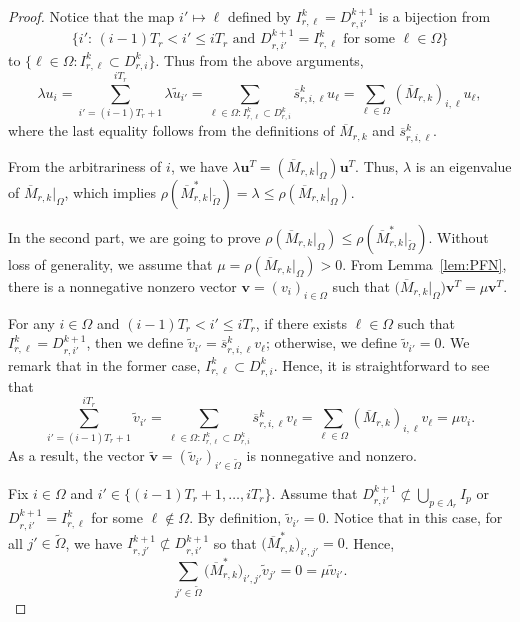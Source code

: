 \documentclass[10pt,a4paper]{amsart}
\def\wdt{\widetilde}
\newcommand{\bfu}{{\mathbf u}}
\newcommand{\bfv}{{\mathbf v}}
\newcommand{\upM}{{\overline{M}}}
\newcommand{\ups}{{\overline{s} }}
\begin{document}
\begin{proof}

Notice that the map
$i'\mapsto \ell$ defined by $I^{k}_{r,\ell}=D^{k+1}_{r,i'}$ is a bijection from 
\[
\big\{i':\, (i-1)T_r<i'\leq iT_r \mbox{ and } D_{r,i'}^{k+1}=I_{r,\ell}^k \mbox{ for some } \ell\in \Omega\big\}
\] 
to $\{\ell\in \Omega: I_{r,\ell}^k \subset D_{r,i}^k \}$. Thus from the above arguments, 
\[
  \lambda {u}_i=\sum_{i'=(i-1)T_r+1}^{iT_r} \lambda \wdt{u}_{i'}=\sum_{\ell\in \Omega: I_{r,\ell}^k \subset D_{r,i}^k} \ups_{r,i,\ell}^k u_{\ell}=
   \sum_{\ell\in \Omega} (\upM_{r,k})_{i,\ell}  u_{\ell},
\]
where the last equality follows from the definitions of $\upM_{r,k}$ and $\ups_{r,i,\ell}^k$.


From the arbitrariness of $i$, we have $\lambda \bfu^T=(\upM_{r,k} |_\Omega) \bfu^T$.
Thus, $\lambda$ is an eigenvalue of $\upM_{r,k}|_\Omega $, which implies $\rho(\upM_{r,k}^* |_{\wdt{\Omega}} )=\lambda \leq \rho(\upM_{r,k}|_\Omega)$.


In the second part, we are going to prove $\rho(\upM_{r,k}|_\Omega)\leq \rho(\upM_{r,k}^* |_{\wdt{\Omega}})$. Without loss of generality, we assume that 
$\mu=\rho(\upM_{r,k}|_\Omega)>0$. 
From Lemma~\ref{lem:PFN}, there is a nonnegative nonzero vector $\bfv=(v_i)_{i\in\Omega}$ such that $\big( \upM_{r,k} |_\Omega \big)\bfv^T =\mu \bfv^T$.

For any $i\in \Omega$ and $(i-1)T_r<i'\leq iT_r$, if there exists $\ell \in \Omega$ such that $I_{r,\ell}^k=D_{r,i'}^{k+1}$, then we define $\wdt{v}_{i'}=	\ups_{r,i,\ell}^k v_{\ell}$; otherwise, we define $\wdt{v}_{i'}=0$. We remark that in the former case, $I_{r,\ell}^k\subset D_{r,i}^k$. Hence,
it is straightforward to see that
\begin{equation}\label{eq:3-eigen-vv-sum}
	\sum_{i'=(i-1)T_r+1}^{iT_r} \wdt{v}_{i'}=\sum_{\ell\in \Omega: I_{r,\ell}^k \subset D_{r,i}^k} \ups_{r,i,\ell}^k v_{\ell}=\sum_{\ell\in \Omega} (\upM_{r,k})_{i,\ell}  v_{\ell}=\mu v_i.
\end{equation}
As a result, the vector $\wdt{\bfv}=(\wdt{v}_{i'})_{i'\in\wdt{\Omega}}$ is nonnegative and nonzero.


Fix $i\in\Omega$ and $i'\in\{(i-1)T_r+1,\ldots,iT_r\}$. Assume that $D_{r,i'}^{k+1}\not\subset \bigcup_{p\in \Lambda_r} I_p$ or $D_{r,i'}^{k+1}=I_{r,\ell}^k$ for some $\ell\not\in \Omega$. By definition, $\wdt{v}_{i'}=0$.
Notice that in this case, for all $j'\in \wdt{\Omega}$, we have $I^{k+1}_{r,j'}\not\subset D_{r,i'}^{k+1}$ so that $\big(\upM_{r,k}^*\big)_{i',j'}=0$. Hence, 
\[
\sum_{j'\in \wdt{\Omega}} \big(\upM_{r,k}^*\big)_{i',j'} \wdt{v}_{j'}=0=\mu \wdt{v}_{i'}.
\]


\end{proof}
\end{document}
